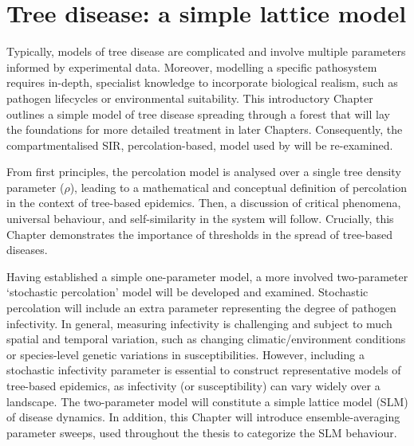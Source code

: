 
\chapter{Tree disease: a simple lattice model}
\label{chapter:SLM}

Typically, models of tree disease are complicated and involve multiple parameters informed by experimental data. Moreover, modelling a specific pathosystem requires in-depth, specialist knowledge to incorporate biological realism, such as pathogen lifecycles or environmental suitability. This introductory Chapter outlines a simple model of tree disease spreading through a forest that will lay the foundations for more detailed treatment in later Chapters.
Consequently, the compartmentalised SIR, percolation-based, model used by \cite{OROZCOFUENTES201912} will be re-examined. 

From first principles, the percolation model is analysed over a single tree density parameter ($\rho$), leading to a mathematical and conceptual definition of percolation in the context of tree-based epidemics. 
Then, a discussion of critical phenomena, universal behaviour, and self-similarity in the system will follow. Crucially, this Chapter demonstrates the importance of thresholds in the spread of tree-based diseases.

Having established a simple one-parameter model, a more involved two-parameter `stochastic percolation' model will be developed and examined. 
Stochastic percolation will include an extra parameter representing the degree of pathogen infectivity. 
In general, measuring infectivity is challenging and subject to much spatial and temporal variation, such as changing climatic/environment conditions or species-level genetic variations in susceptibilities.  
However, including a stochastic infectivity parameter is essential to construct representative models of tree-based epidemics, as infectivity (or susceptibility) can vary widely over a landscape.
The two-parameter model will constitute a simple lattice model (SLM) of disease dynamics. 
In addition, this Chapter will introduce ensemble-averaging parameter sweeps, used throughout the thesis to categorize the SLM behaviour.

